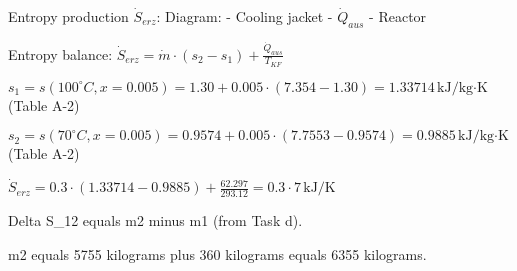 Entropy production \( \dot{S}_{erz} \):  
Diagram:  
- Cooling jacket  
- \( \dot{Q}_{aus} \)  
- Reactor  

Entropy balance:  
\( \dot{S}_{erz} = \dot{m} \cdot (s_{2} - s_{1}) + \frac{\dot{Q}_{aus}}{T_{KF}} \)  

\( s_{1} = s(100^\circ C, x = 0.005) = 1.30 + 0.005 \cdot (7.354 - 1.30) = 1.33714 \, \text{kJ/kg·K} \) (Table A-2)  

\( s_{2} = s(70^\circ C, x = 0.005) = 0.9574 + 0.005 \cdot (7.7553 - 0.9574) = 0.9885 \, \text{kJ/kg·K} \) (Table A-2)  

\( \dot{S}_{erz} = 0.3 \cdot (1.33714 - 0.9885) + \frac{62.297}{293.12} = 0.3 \cdot 7 \, \text{kJ/K} \)

Delta S_12 equals m2 minus m1 (from Task d).  

m2 equals 5755 kilograms plus 360 kilograms equals 6355 kilograms.